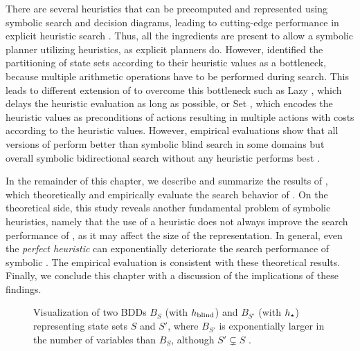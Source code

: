 There are several heuristics that can be precomputed and represented using symbolic search and decision diagrams, leading to cutting-edge performance in explicit heuristic search \autocite{edelkamp-aips2002,franco-et-al-ijcai2017,franco-et-al-ipc2018b,moraru-et-al-ki2019}.
Thus, all the ingredients are present to allow a symbolic planner utilizing heuristics, as explicit planners do.
However, \textcite{jensen-et-al-aij2008} identified the partitioning of state sets according to their heuristic values as a bottleneck, because multiple arithmetic operations have to be performed during search.
This leads to different extension of \bddastar{} to overcome this bottleneck such as Lazy \bddastar{} \autocite{torralba-phd2015}, which delays the heuristic evaluation as long as possible, or Set\astar{} \autocite{jensen-et-al-aij2008}, which encodes the heuristic values as preconditions of actions resulting in multiple actions with costs according to the heuristic values.
However, empirical evaluations show that all versions of \bddastar{} perform better than symbolic blind search in some domains but overall symbolic bidirectional search without any heuristic  performs best \autocite{torralba-et-al-ijcai2016}.

In the remainder of this chapter, we describe and summarize the results of \textcite{speck-et-al-icaps2020}, which theoretically and empirically evaluate the search behavior of \bddastar{}.
On the theoretical side, this study reveals another fundamental problem of symbolic heuristics, namely that the use of a heuristic does not always improve the search performance of \bddastar{}, as it may affect the size of the representation.
In general, even the \emph{perfect heuristic} can exponentially deteriorate the search performance of symbolic \astar{}.
The empirical evaluation is consistent with these theoretical results.
Finally, we conclude this chapter with a discussion of the implications of these
findings.

\begin{figure}
    \begin{center}
        
    \end{center}
    \caption[Visualization of two BDDs with exponential size difference.]{
        Visualization of two BDDs $B_S$ (with $h_{\text{\scriptsize blind}}$) and $B_{S'}$ (with $h_{\scriptsize \star}$) representing state sets $S$ and $S'$, where $B_{S'}$ is exponentially larger in the number of variables than $B_{S}$, although $S' \subsetneq S$ \autocite{speck-et-al-icaps2020}.}
    \label{fid:bddastar_proof}
\end{figure}

